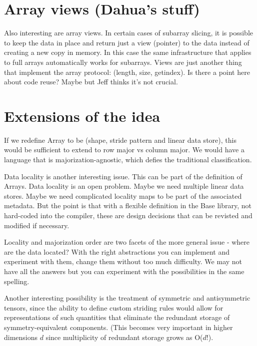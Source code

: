 \documentclass[preprint]{sigplanconf}
\begin{document}
\section{Array views (Dahua's stuff)}

Also interesting are array views. In certain cases of subarray slicing, it is
possible to keep the data in place and return just a view (pointer) to the
data instead of creating a new copy in memory. In this case the same
infrastructure that applies to full arrays automatically works for subarrays.
Views are just another thing that implement the array protocol: (length, size,
getindex). Is there a point here about code reuse? Maybe but Jeff thinks it's
not crucial.


\section{Extensions of the idea}

If we redefine Array to be (shape, stride pattern and linear data store), this
would be sufficient to extend to row major vs column major. We would have a
language that is majorization-agnostic, which defies the traditional
classification.

Data locality is another interesting issue. This can be part of the definition
of Arrays. Data locality is an open problem. Maybe we need multiple linear
data stores. Maybe we need complicated locality maps to be part of the
associated metadata. But the point is that with a flexible definition in the
Base library, not hard-coded into the compiler, these are design decisions
that can be revisted and modified if necessary.

Locality and majorization order are two facets of the more general issue -
where are the data located? With the right abstractions you can implement and
experiment with them, change them without too much difficulty. We may not have
all the answers but you can experiment with the possibilities in the same
spelling.

Another interesting possibility is the treatment of symmetric and
antisymmetric tensors, since the ability to define custom striding rules would
allow for representations of such quantities that eliminate the redundant
storage of symmetry-equivalent components. (This becomes very important in
higher dimensions $d$ since multiplicity of redundant storage grows as
O($d!$).

\end{document}
